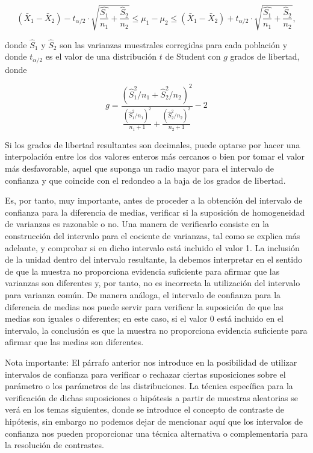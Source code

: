 \documentclass[
]{article}
\begin{document}
\[
\left(\bar{X}_{1}-\bar{X}_{2}\right)-t_{\alpha / 2} \cdot \sqrt{\frac{\hat{S_{1}}}{n_{1}}+\frac{\hat{S}_{2}}{n_{2}}} \leq \mu_{1}-\mu_{2} \leq\left(\bar{X}_{1}-\bar{X}_{2}\right)+t_{\alpha / 2} \cdot \sqrt{\frac{\hat{S_{1}}}{n_{1}}+\frac{\hat{S}_{2}}{n_{2}}},
\]

donde \(\hat{S}_{1}\) y \(\hat{S}_{2}\) son las varianzas muestrales corregidas para cada población y donde \(t_{\alpha / 2}\) es el valor de una distribución \(t\) de Student con \(g\) grados de libertad, donde

\[
g=\frac{\left(\hat{S}_{1}^{2} / n_{1}+\hat{S}_{2}^{2} / n_{2}\right)^{2}}{\frac{\left(\hat{S}_{1}^{2} / n_{1}\right)^{2}}{n_{1}+1}+\frac{\left(\hat{S}_{2}^{2} / n_{2}\right)^{2}}{n_{2}+1}}-2
\]

Si los grados de libertad resultantes son decimales, puede optarse por hacer una interpolación entre los dos valores enteros más cercanos o bien por tomar el valor más desfavorable, aquel que suponga un radio mayor para el intervalo de confianza y que coincide con el redondeo a la baja de los grados de libertad.

Es, por tanto, muy importante, antes de proceder a la obtención del intervalo de confianza para la diferencia de medias, verificar si la suposición de homogeneidad de varianzas es razonable o no. Una manera de verificarlo consiste en la construcción del intervalo para el cociente de varianzas, tal como se explica más adelante, y comprobar si en dicho intervalo está incluido el valor 1. La inclusión de la unidad dentro del intervalo resultante, la debemos interpretar en el sentido de que la muestra no proporciona evidencia suficiente para afirmar que las varianzas son diferentes y, por tanto, no es incorrecta la utilización del intervalo para varianza común. De manera análoga, el intervalo de confianza para la diferencia de medias nos puede servir para verificar la suposición de que las medias son iguales o diferentes; en este caso, si el valor 0 está incluido en el intervalo, la conclusión es que la muestra no proporciona evidencia suficiente para afirmar que las medias son diferentes.

Nota importante: El párrafo anterior nos introduce en la posibilidad de utilizar intervalos de confianza para verificar o rechazar ciertas suposiciones sobre el parámetro o los parámetros de las distribuciones. La técnica específica para la verificación de dichas suposiciones o hipótesis a partir de muestras aleatorias se verá en los temas siguientes, donde se introduce el concepto de contraste de hipótesis, sin embargo no podemos dejar de mencionar aquí que los intervalos de confianza nos pueden proporcionar una técnica alternativa o complementaria para la resolución de contrastes.
\end{document}
